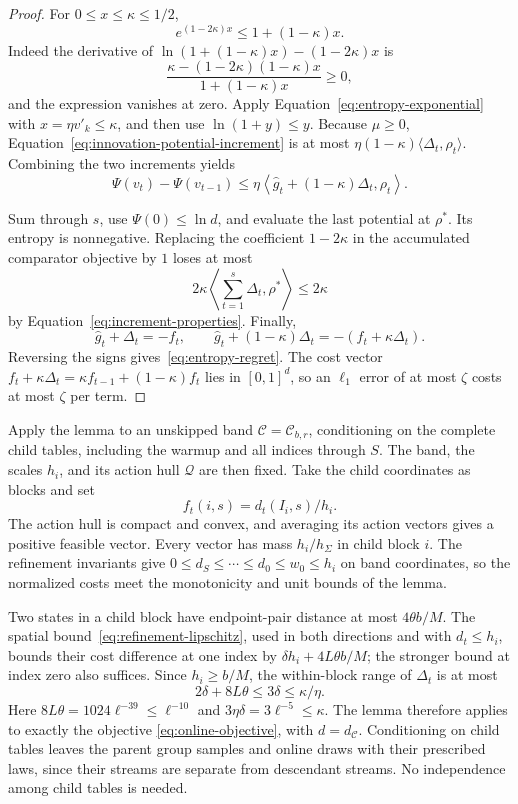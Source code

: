 \begin{proof}
For $0\le x\le\kappa\le1/2$,
\begin{equation}\label{eq:entropy-exponential}
 e^{(1-2\kappa)x}\le1+(1-\kappa)x.
\end{equation}
Indeed the derivative of
$\ln(1+(1-\kappa)x)-(1-2\kappa)x$ is
\[
 \frac{\kappa-(1-2\kappa)(1-\kappa)x}{1+(1-\kappa)x}\ge0,
\]
and the expression vanishes at zero.
Apply Equation~\ref{eq:entropy-exponential} with
$x=\eta v'_k\le\kappa$, and then use
$\ln(1+y)\le y$. Because $\mu\ge0$,
Equation~\ref{eq:innovation-potential-increment} is at most
$\eta(1-\kappa)\langle\Delta_t,\rho_t\rangle$.
Combining the two increments yields
\[
 \Psi(v_t)-\Psi(v_{t-1})
 \le\eta\left\langle
      \widehat g_t+(1-\kappa)\Delta_t,\rho_t\right\rangle.
\]

Sum through $s$, use $\Psi(0)\le\ln d$, and evaluate the
last potential at $\rho^*$. Its entropy is nonnegative. Replacing the
coefficient $1-2\kappa$ in the accumulated comparator objective by $1$
loses at most
\[
 2\kappa\left\langle\sum_{t=1}^s\Delta_t,\rho^*\right\rangle
 \le2\kappa
\]
by Equation~\ref{eq:increment-properties}.  Finally,
\[
 \widehat g_t+\Delta_t=-f_t,\qquad
 \widehat g_t+(1-\kappa)\Delta_t=-(f_t+\kappa\Delta_t).
\]
Reversing the signs gives~\eqref{eq:entropy-regret}.
The cost vector $f_t+\kappa\Delta_t=\kappa f_{t-1}+(1-\kappa)f_t$
lies in $[0,1]^d$, so an $\ell_1$ error of at most $\zeta$ costs at most
$\zeta$ per term.
\end{proof}

Apply the lemma to an unskipped band $\mathcal C=\mathcal C_{b,r}$,
conditioning on the complete child tables, including the warmup and all
indices through $S$.  The band, the scales $h_i$, and its action hull
$\mathcal Q$ are then fixed.  Take the child coordinates as blocks and set
\[
 f_t(i,s)=d_t(I_i,s)/h_i.
\]
The action hull is compact and convex, and averaging its action vectors
gives a positive feasible vector.  Every vector has mass $h_i/h_\Sigma$
in child block $i$.  The refinement invariants give
$0\le d_S\le\cdots\le d_0\le w_0\le h_i$ on band coordinates, so the
normalized costs meet the monotonicity and unit bounds of the lemma.

Two states in a child block have endpoint-pair distance at most
$4\theta b/M$.  The spatial bound~\eqref{eq:refinement-lipschitz}, used
in both directions and with $d_t\le h_i$, bounds their cost difference
at one index by $\delta h_i+4L\theta b/M$; the stronger bound at index
zero also suffices.  Since $h_i\ge b/M$, the within-block range of
$\Delta_t$ is at most
\begin{equation}\label{eq:increment-range}
 2\delta+8L\theta\le3\delta\le\kappa/\eta.
\end{equation}
Here $8L\theta=1024\ell^{-39}\le\ell^{-10}$ and
$3\eta\delta=3\ell^{-5}\le\kappa$.
The lemma therefore applies to exactly the objective
\eqref{eq:online-objective}, with $d=d_{\mathcal C}$.
Conditioning on child tables leaves the parent group samples and online
draws with their prescribed laws, since their streams are separate from
descendant streams.  No independence among child tables is needed.

